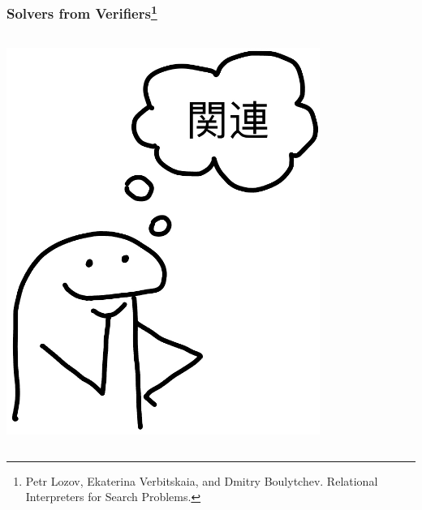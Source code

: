 \documentclass[xcolor={dvipsnames}, aspectratio=169]{beamer}
\begin{document}
\begin{frame}[fragile]
  \frametitle{Solvers from Verifiers\footnote{Petr Lozov, Ekaterina Verbitskaia, and Dmitry Boulytchev. Relational Interpreters for Search Problems.}}
  \begin{columns}    
    \begin{column}{0.35\textwidth}
      \centering
      \includegraphics[width=0.8\textwidth]{pic/kanren.jpg}
    \end{column}
    \begin{column}{0.75\textwidth} 
      \vspace{-1cm}

    \end{column}
  \end{columns} 
\end{frame}
\end{document}

